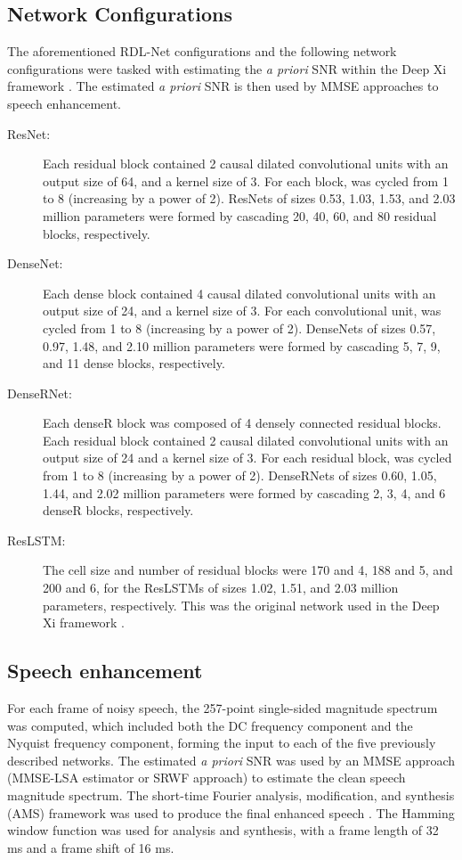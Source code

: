 \documentclass[letterpaper]{article} \usepackage{aaai20}  \usepackage{times}  \usepackage{helvet} \usepackage{courier}  \usepackage[hyphens]{url}  \usepackage{graphicx} \urlstyle{rm} \def\UrlFont{\rm}  \usepackage{graphicx}  \frenchspacing  \setlength{\pdfpagewidth}{8.5in}  \setlength{\pdfpageheight}{11in}
\begin{document}
\subsection{Network Configurations}
The aforementioned RDL-Net configurations and the following network configurations were tasked with estimating the \textit{a priori} SNR within the Deep Xi framework \cite{nicolson2019deep}. The estimated \textit{a priori} SNR is then used by MMSE approaches to speech enhancement.
\begin{description}
	\item[ResNet:] Each residual block contained 2 causal dilated convolutional units with an output size of 64, and a kernel size of 3. For each block,  was cycled from 1 to 8 (increasing by a power of 2). ResNets of sizes 0.53, 1.03, 1.53, and 2.03 million parameters were formed by cascading 20, 40, 60, and 80 residual blocks, respectively.
	
	\item[DenseNet:] Each dense block contained 4 causal dilated convolutional units with an output size of 24, and a kernel size of 3. For each convolutional unit,  was cycled from 1 to 8 (increasing by a power of 2). DenseNets of sizes 0.57, 0.97, 1.48, and 2.10 million parameters were formed by cascading 5, 7, 9, and 11 dense blocks, respectively.
	
	\item[DenseRNet:] Each denseR block was composed of 4 densely connected residual blocks. Each residual block contained 2 causal dilated convolutional units with an output size of 24 and a kernel size of 3. For each residual block,  was cycled from 1 to 8 (increasing by a power of 2). DenseRNets of sizes 0.60, 1.05, 1.44, and 2.02 million parameters were formed by cascading 2, 3, 4, and 6 denseR blocks, respectively.	
	
	\item[ResLSTM:] The cell size and number of residual blocks were 170 and 4, 188 and 5, and 200 and 6, for the ResLSTMs of sizes 1.02, 1.51, and 2.03 million parameters, respectively. This was the original network used in the Deep Xi framework \cite{nicolson2019deep}.
\end{description}

\subsection{Speech enhancement}
For each frame of noisy speech, the 257-point single-sided magnitude spectrum was computed, which included both the DC frequency component and the Nyquist frequency component, forming the input to each of the five previously described networks. The estimated \textit{a priori} SNR was used by an MMSE approach (MMSE-LSA estimator or SRWF approach) to estimate the clean speech magnitude spectrum. The short-time Fourier analysis, modification, and synthesis (AMS) framework was used to produce the final enhanced speech \cite{nicolson2019deep}. The Hamming window function was used for analysis and synthesis, with a frame length of 32 ms and a frame shift of 16 ms. 
\end{document}

